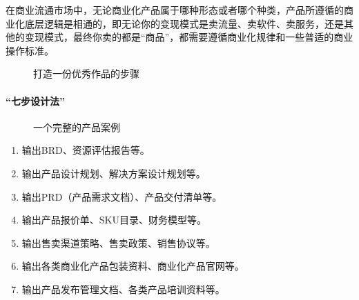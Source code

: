 \documentclass[letterpaper,11pt,english]{sphinxmanual}
\begin{document}
在商业流通市场中，无论商业化产品属于哪种形态或者哪个种类，产品所遵循的商业化底层逻辑是相通的，即无论你的变现模式是卖流量、卖软件、卖服务，还是其他的变现模式，最终你卖的都是“商品”，都需要遵循商业化规律和一些普适的商业操作标准。

\begin{figure}[H]
\centering
\capstart

\noindent{}
\caption{打造一份优秀作品的步骤}\label{\detokenize{chapter_knowledge/steps:id5}}\end{figure}


\paragraph{“七步设计法”}
\label{\detokenize{chapter_knowledge/steps:id3}}
\begin{figure}[H]
\centering
\capstart

\noindent{}
\caption{一个完整的产品案例\sphinxfootnotemark[404]}\label{\detokenize{chapter_knowledge/steps:id6}}\end{figure}
%
\begin{footnotetext}[404]\sphinxAtStartFootnote
{}
%
\end{footnotetext}\ignorespaces \begin{enumerate}
%
\item {} 
输出BRD、资源评估报告等。

\item {} 
输出产品设计规划、解决方案设计规划等。

\item {} 
输出PRD（产品需求文档）、产品交付清单等。

\item {} 
输出产品报价单、SKU目录、财务模型等。

\item {} 
输出售卖渠道策略、售卖政策、销售协议等。

\item {} 
输出各类商业化产品包装资料、商业化产品官网等。

\item {} 
输出产品发布管理文档、各类产品培训资料等。

\end{enumerate}
\end{document}
